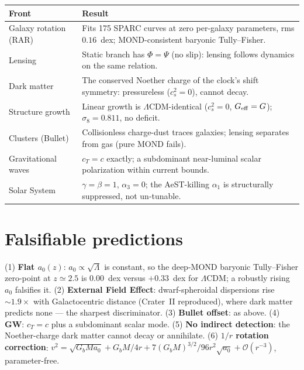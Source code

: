 \documentclass[11pt,letterpaper]{article}
\begin{document}
\begin{center}\small
\begin{tabular}{@{}L{0.30\textwidth}L{0.62\textwidth}@{}}
\toprule
\textbf{Front} & \textbf{Result} \\
\midrule
Galaxy rotation (RAR) & Fits 175 SPARC curves at zero per-galaxy parameters, rms $0.16$~dex; MOND-consistent baryonic Tully--Fisher. \\
Lensing & Static branch has $\Phi=\Psi$ (no slip): lensing follows dynamics on the same relation. \\
Dark matter & The conserved Noether charge of the clock's shift symmetry: pressureless ($c_s^2=0$), cannot decay. \\
Structure growth & Linear growth is $\Lambda$CDM-identical ($c_s^2=0$, $G_{\rm eff}=G$); $\sigma_8=0.811$, no deficit. \\
Clusters (Bullet) & Collisionless charge-dust traces galaxies; lensing separates from gas (pure MOND fails). \\
Gravitational waves & $c_T=c$ exactly; a subdominant near-luminal scalar polarization within current bounds. \\
Solar System & $\gamma=\beta=1$, $\alpha_3=0$; the AeST-killing $\alpha_1$ is structurally suppressed, not un-tunable. \\
\bottomrule
\end{tabular}
\end{center}

\section{Falsifiable predictions}
(1) \textbf{Flat $a_0(z)$}: $a_0\propto\sqrt\Lambda$ is constant, so the deep-MOND baryonic Tully--Fisher
zero-point at $z\simeq2.5$ is $0.00$~dex versus $+0.33$~dex for $\Lambda$CDM; a robustly rising $a_0$
falsifies it. (2) \textbf{External Field Effect}: dwarf-spheroidal dispersions rise $\sim\!1.9\times$ with
Galactocentric distance (Crater~II reproduced), where dark matter predicts none --- the sharpest
discriminator. (3) \textbf{Bullet offset}: as above. (4) \textbf{GW}: $c_T=c$ plus a subdominant scalar mode.
(5) \textbf{No indirect detection}: the Noether-charge dark matter cannot decay or annihilate. (6)
\textbf{$1/r$ rotation correction}: $v^2=\sqrt{G_bMa_0}+G_bM/4r+7(G_bM)^{3/2}/96r^2\sqrt{a_0}+\mathcal O(r^{-3})$,
parameter-free.
\end{document}
